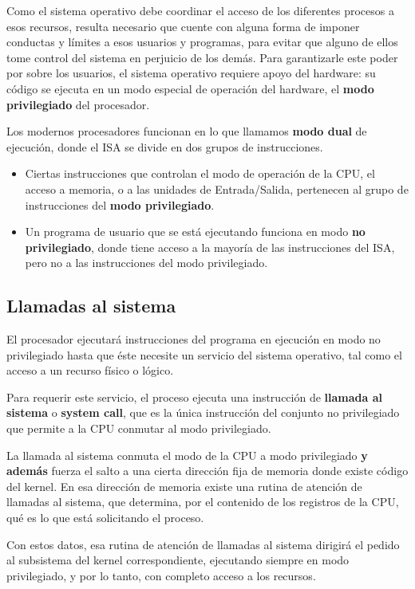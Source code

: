 \documentclass[spanish,A4,]{article}
\begin{document}
Como el sistema operativo debe coordinar el acceso de los diferentes
procesos a esos recursos, resulta necesario que cuente con alguna forma
de imponer conductas y límites a esos usuarios y programas, para evitar
que alguno de ellos tome control del sistema en perjuicio de los demás.
Para garantizarle este poder por sobre los usuarios, el sistema
operativo requiere apoyo del hardware: su código se ejecuta en un modo
especial de operación del hardware, el \textbf{modo privilegiado} del
procesador.

Los modernos procesadores funcionan en lo que llamamos \textbf{modo
dual} de ejecución, donde el ISA se divide en dos grupos de
instrucciones.

\begin{itemize}
\itemsep1pt\parskip0pt
\item
  Ciertas instrucciones que controlan el modo de operación de la CPU, el
  acceso a memoria, o a las unidades de Entrada/Salida, pertenecen al
  grupo de instrucciones del \textbf{modo privilegiado}.
\item
  Un programa de usuario que se está ejecutando funciona en modo
  \textbf{no privilegiado}, donde tiene acceso a la mayoría de las
  instrucciones del ISA, pero no a las instrucciones del modo
  privilegiado.
\end{itemize}

\subsection{Llamadas al sistema}\label{llamadas-al-sistema}

El procesador ejecutará instrucciones del programa en ejecución en modo
no privilegiado hasta que éste necesite un servicio del sistema
operativo, tal como el acceso a un recurso físico o lógico.

Para requerir este servicio, el proceso ejecuta una instrucción de
\textbf{llamada al sistema} o \textbf{system call}, que es la única
instrucción del conjunto no privilegiado que permite a la CPU conmutar
al modo privilegiado.

La llamada al sistema conmuta el modo de la CPU a modo privilegiado
\textbf{y además} fuerza el salto a una cierta dirección fija de memoria
donde existe código del kernel. En esa dirección de memoria existe una
rutina de atención de llamadas al sistema, que determina, por el
contenido de los registros de la CPU, qué es lo que está solicitando el
proceso.

Con estos datos, esa rutina de atención de llamadas al sistema dirigirá
el pedido al subsistema del kernel correspondiente, ejecutando siempre
en modo privilegiado, y por lo tanto, con completo acceso a los
recursos.
\end{document}
